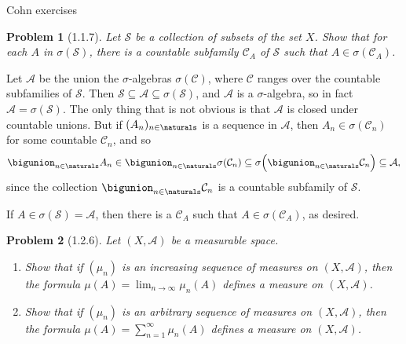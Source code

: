 \documentclass[a4paper, 11pt]{memoir}
\theoremstyle{plaincustomnumber}
\newtheorem{problem}{Problem}
\theoremstyle{changedotbreakcustomnumber}
\newcommand{\calS}{\mathcal{S}}
\newcommand{\calA}{\mathcal{A}}
\newcommand{\calC}{\mathcal{C}}
\begin{document}
Cohn exercises

\begin{problem}[1.1.7]
    Let $\calS$ be a collection of subsets of the set $X$. Show that for each $A$ in $\sigma(\calS)$, there is a countable subfamily $\calC_A$ of $\calS$ such that $A \in \sigma(\calC_A)$.
\end{problem}

\begin{solution}
    Let $\calA$ be the union the $\sigma$-algebras $\sigma(\calC)$, where $\calC$ ranges over the countable subfamilies of $\calS$. Then $\calS \subseteq \calA \subseteq \sigma(\calS)$, and $\calA$ is a $\sigma$-algebra, so in fact $\calA = \sigma(\calS)$. The only thing that is not obvious is that $\calA$ is closed under countable unions. But if $(A_n)_{n \in \naturals}$ is a sequence in $\calA$, then $A_n \in \sigma(\calC_n)$ for some countable $\calC_n$, and so
    \begin{equation*}
        \bigunion_{n \in \naturals} A_n
            \in \bigunion_{n \in \naturals} \sigma(\calC_n)
            \subseteq \sigma \Bigl( \bigunion_{n \in \naturals} \calC_n \Bigr)
            \subseteq \calA,
    \end{equation*}
    since the collection $\bigunion_{n \in \naturals} \calC_n$ is a countable subfamily of $\calS$.

    If $A \in \sigma(\calS) = \calA$, then there is a $\calC_A$ such that $A \in \sigma(\calC_A)$, as desired.
\end{solution}


\begin{problem}[1.2.6]
    Let $(X,\calA)$ be a measurable space.
    \begin{enumerate}
        \item Show that if $(\mu_n)$ is an increasing sequence of measures on $(X,\calA)$, then the formula $\mu(A) = \lim_{n \to \infty} \mu_n(A)$ defines a measure on $(X,\calA)$.
        
        \item Show that if $(\mu_n)$ is an arbitrary sequence of measures on $(X,\calA)$, then the formula $\mu(A) = \sum_{n=1}^\infty \mu_n(A)$ defines a measure on $(X,\calA)$.
    \end{enumerate}
\end{problem}
\end{document}
